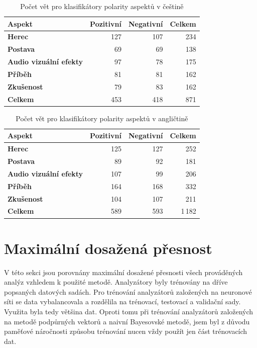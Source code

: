 \begin{table}[h!]
  \begin{center}
    \caption{Počet vět pro klasifikátory polarity aspektů v češtině}
    \label{tab:table1.2}
    \begin{tabular}{l|r|r|r}
      \textbf{Aspekt} & \textbf{Pozitivní} & \textbf{Negativní} & \textbf{Celkem}\\ 
      \hline
      \textbf{Herec} & 127 & 107 & 234\\ 
      \textbf{Postava} & 69 & 69 & 138 \\ 
      \textbf{Audio vizuální efekty} & 97 & 78 & 175\\ 
      \textbf{Příběh} & 81 & 81 & 162\\ 
      \textbf{Zkušenost} & 79 & 83 & 162\\ 
      \textbf{Celkem} & 453 & 418 & 871\\ 
    \end{tabular}
  \end{center}
\end{table}
\FloatBarrier
\begin{table}[h!]
  \begin{center}
    \caption{Počet vět pro klasifikátory polarity aspektů v angličtině}
    \label{tab:table1.3}
    \begin{tabular}{l|r|r|r}
      \textbf{Aspekt} & \textbf{Pozitivní} & \textbf{Negativní} & \textbf{Celkem}\\ 
      \hline
      \textbf{Herec} & 125 & 127 & 252\\ 
      \textbf{Postava} & 89 & 92 & 181 \\ 
      \textbf{Audio vizuální efekty} & 107 & 99 & 206\\ 
      \textbf{Příběh} & 164 & 168 & 332\\ 
      \textbf{Zkušenost} & 104 & 107 & 211\\ 
      \textbf{Celkem} & 589 & 593 & 1\,182\\ 
    \end{tabular}
  \end{center}
\end{table}
\FloatBarrier


\section{Maximální dosažená přesnost}
V této sekci jsou porovnány maximální dosažené přesnosti všech prováděných analýz vzhledem k použité metodě. Analyzátory byly trénovány na dříve popsaných datových sadách. Pro trénování analyzátorů založených na neuronové síti se data vybalancovala a rozdělila na trénovací, testovací a validační sady. Využita byla tedy většina dat. Oproti tomu při trénování analyzátorů založených na metodě podpůrných vektorů a naivní Bayesovské metodě, jsem byl z důvodu paměťové náročnosti způsobu trénování nucen vždy použít jen část trénovacích dat. 

